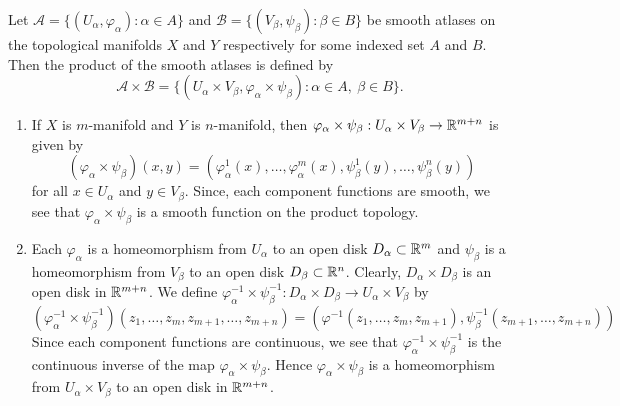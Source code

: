 
\begin{solution}
    Let $\mathcal{A}=\{(U_\alpha,\varphi_\alpha):
    \alpha\in A\}$ and 
    $\mathcal{B}=\{(V_\beta,\psi_\beta):
    \beta\in B\}$ be smooth atlases on the
    topological
    manifolds $X$ and $Y$ respectively
    for some indexed set
    $A$ and $B$. Then the product of the smooth
    atlases is defined by
    $$\mathcal{A\times B}=\{(U_\alpha\times
    V_\beta,\varphi_\alpha\times \psi_\beta):
    \alpha\in A, \ \beta\in B\}.$$
    
    \begin{enumerate}
        \item If $X$ is $m$-manifold and $Y$ is $n$-manifold,
        then $\varphi_\alpha\times \psi_\beta:
        U_\alpha\times V_\beta\to \mathbb{R}^{m+n}$ is
        given by $$(\varphi_\alpha\times \psi_\beta)
        (x,y)=(\varphi_\alpha^1(x),\ldots,
        \varphi_\alpha^m(x),
        \psi_\beta^1(y),\ldots,\psi_\beta^n(y))$$
        for all $x\in U_\alpha$ and $y\in V_\beta$.
        Since, each component functions are smooth,
        we see that $\varphi_\alpha\times \psi_\beta$
        is a smooth function on the product
        topology.

        \vspace*{3mm}
        \item Each $\varphi_\alpha$ is a
        homeomorphism from $U_\alpha$ to an open
        disk $D_\alpha\subset\mathbb{R}^m$ and 
        $\psi_\beta$ is a
        homeomorphism from $V_\beta$ to an open
        disk $D_\beta\subset\mathbb{R}^n$. Clearly,
        $D_\alpha\times D_\beta$ is an open
        disk in $\mathbb{R}^{m+n}$. We define
        $\varphi_\alpha^{-1}\times \psi_\beta
        ^{-1}:D_\alpha\times D_\beta\to
        U_\alpha\times V_\beta$ by
        $$(\varphi_\alpha^{-1}\times \psi_\beta
        ^{-1})(z_1,\ldots,z_m,z_{m+1},\ldots,z_{m+n})
        =(\varphi^{-1}(z_1,\ldots,z_m,z_{m+1}),
        \psi_\beta^{-1}(z_{m+1},\ldots,z_{m+n}))$$
        Since each component functions are
        continuous, we see that
        $\varphi_\alpha^{-1}\times \psi_\beta
        ^{-1}$ is the continuous inverse of the
        map $\varphi_\alpha\times \psi_\beta$.
        Hence $\varphi_\alpha\times \psi_\beta$
        is a homeomorphism from
        $U_\alpha\times V_\beta$ to an open
        disk in $\mathbb{R}^{m+n}$.


\end{enumerate}
\end{solution}
